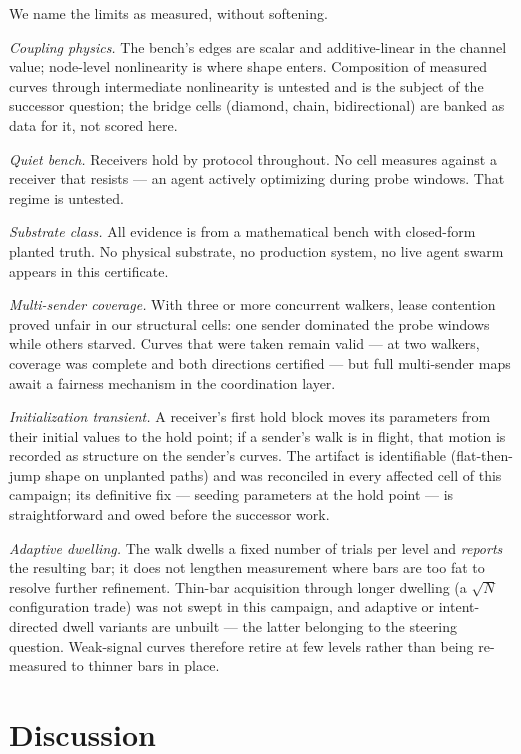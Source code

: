 \documentclass[11pt,a4paper]{article}
\begin{document}
We name the limits as measured, without softening.

\emph{Coupling physics.} The bench's edges are scalar and
additive-linear in the channel value; node-level nonlinearity is
where shape enters. Composition of measured curves through
intermediate nonlinearity is untested and is the subject of the
successor question; the bridge cells (diamond, chain, bidirectional)
are banked as data for it, not scored here.

\emph{Quiet bench.} Receivers hold by protocol throughout. No cell
measures against a receiver that resists --- an agent actively
optimizing during probe windows. That regime is untested.

\emph{Substrate class.} All evidence is from a mathematical bench
with closed-form planted truth. No physical substrate, no
production system, no live agent swarm appears in this certificate.

\emph{Multi-sender coverage.} With three or more concurrent walkers,
lease contention proved unfair in our structural cells: one sender
dominated the probe windows while others starved. Curves that were
taken remain valid --- at two walkers, coverage was complete and
both directions certified --- but full multi-sender maps await a
fairness mechanism in the coordination layer.

\emph{Initialization transient.} A receiver's first hold block
moves its parameters from their initial values to the hold point;
if a sender's walk is in flight, that motion is recorded as
structure on the sender's curves. The artifact is identifiable
(flat-then-jump shape on unplanted paths) and was reconciled in
every affected cell of this campaign; its definitive fix ---
seeding parameters at the hold point --- is straightforward and owed
before the successor work.

\emph{Adaptive dwelling.} The walk dwells a fixed number of trials
per level and \emph{reports} the resulting bar; it does not lengthen
measurement where bars are too fat to resolve further refinement.
Thin-bar acquisition through longer dwelling (a $\sqrt{N}$
configuration trade) was not swept in this campaign, and adaptive
or intent-directed dwell variants are unbuilt --- the latter
belonging to the steering question. Weak-signal curves therefore
retire at few levels rather than being re-measured to thinner bars
in place.

\section{Discussion}
\label{sec:discussion}
\end{document}
